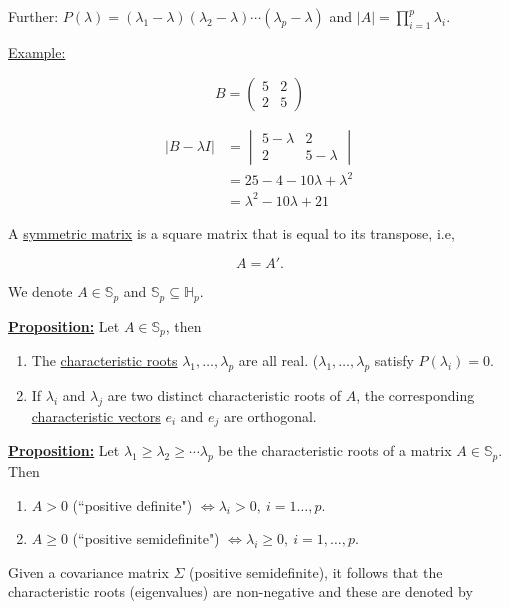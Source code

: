 \documentclass[twoside]{article}
\begin{document}
Further: $P(\lambda)=(\lambda_1-\lambda)(\lambda_2-\lambda)\cdots(\lambda_p-\lambda)$ and $|A|=\prod^{p}_{i=1}\lambda_i.$


\underline{Example:}

$$B=\begin{pmatrix}
	5 & 2\\
	2 & 5
\end{pmatrix}
$$

\begin{equation}
	\begin{split}
		\lvert B-\lambda I\rvert &= \begin{vmatrix}
			5-\lambda & 2 \\
			2 & 5-\lambda 
		\end{vmatrix}\\
		&=25-4-10\lambda +\lambda^2\\
		&=\lambda^2 -10\lambda +21
	\end{split}
\end{equation}

A \underline{symmetric matrix} is a square matrix that is equal to its transpose, i.e,

$$A=A'.$$

We denote $A\in\mathbb{S}_p$ and $\mathbb{S}_p \subseteq \mathbb{H}_p.$

\underline{\textbf{Proposition:}} Let $A\in \mathbb{S}_p$, then

\begin{enumerate}
	\item The \underline{characteristic roots} $\lambda_1,\dots, \lambda_p$ are all real. ($\lambda_1,\dots,\lambda_p$ satisfy $P(\lambda_i)=0$.
	\item If $\lambda_i$ and $\lambda_j$ are two distinct characteristic roots of $A$, the corresponding \underline{characteristic vectors} $e_i$ and $e_j$ are orthogonal.
\end{enumerate}

\underline{\textbf{Proposition:}} Let $\lambda_1\geq \lambda_2\geq\cdots\lambda_p$ be the characteristic roots of a matrix $A\in\mathbb{S}_p$. Then \begin{enumerate}
	\item $A>0$ (``positive definite") $\iff \lambda_i>0,\ i=1\dots, p.$
	\item $A\geq 0$ (``positive semidefinite") $\iff\lambda_i\geq 0,\ i=1,\dots,p.$
\end{enumerate}

Given a covariance matrix $\Sigma$ (positive semidefinite), it follows that the characteristic roots (eigenvalues) are non-negative and these are denoted by
\end{document}
